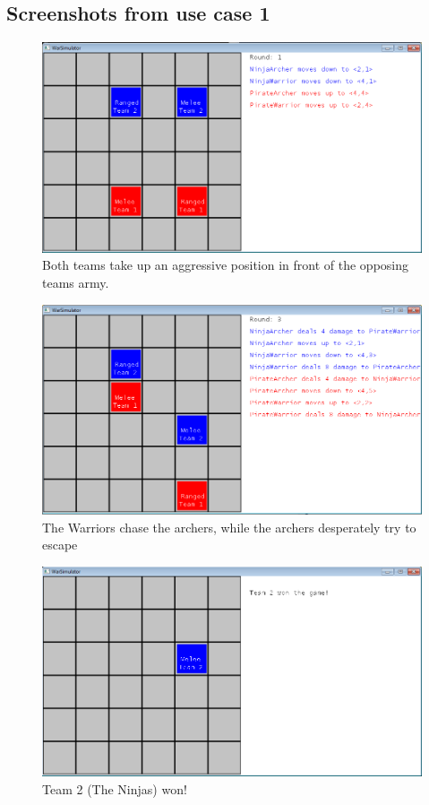 	\subsection*{Screenshots from use case 1}
		\begin{figure}[H]
			\center
			\includegraphics[scale=0.6]{rapport/7/figures/case1-1.png}
			\caption{Both teams take up an aggressive position in front of the opposing teams army.}
		\label{pic:case11}		
		\end{figure}
		\begin{figure}[H]

		\center
			\includegraphics[scale=0.6]{rapport/7/figures/case1-2.png}
			\caption{The Warriors chase the archers, while the archers desperately try to escape}
		\label{pic:case12}
		\end{figure}
		\begin{figure}[H]
		\center
			\includegraphics[scale=0.6]{rapport/7/figures/case1-3.png}
			\caption{Team 2 (The Ninjas) won!}
		\label{pic:case13}
		\end{figure}
		
